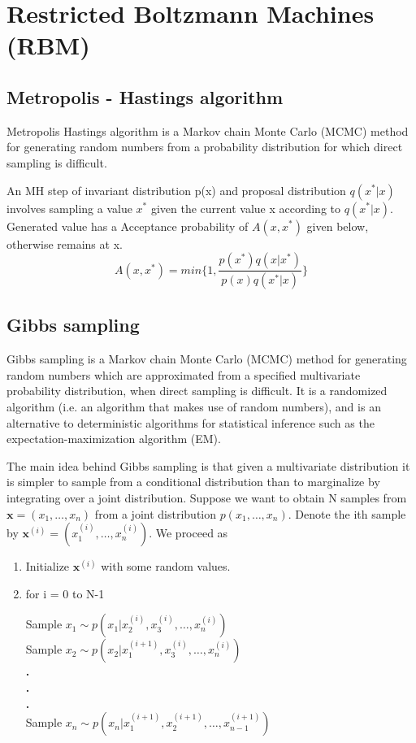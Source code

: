 \section{Restricted Boltzmann Machines (RBM)}

\subsection{Metropolis - Hastings algorithm}

Metropolis Hastings algorithm is a Markov chain Monte Carlo (MCMC) method for generating random numbers from a probability distribution for which direct sampling is difficult.

An MH step of invariant distribution p(x) and proposal distribution $ q(x^{\ast}|x) $ involves sampling a value $ x^{\ast} $ given the current value x according to $ q(x^{\ast} | x) $. Generated value has a Acceptance probability of
$ A(x,x^{\ast})$ given below, otherwise remains at x.
$$ A(x,x^{\ast}) = min\{1,\frac{p(x^\ast)q(x|x^{\ast})}{p(x)q(x^{\ast}|x)}\} $$



\subsection{Gibbs sampling}

Gibbs sampling is a Markov chain Monte Carlo (MCMC) method for generating random numbers which are approximated from a specified multivariate probability distribution, when direct sampling is difficult. It is a randomized algorithm (i.e. an algorithm that makes use of random numbers), and is an alternative to deterministic algorithms for statistical inference such as the expectation-maximization algorithm (EM).

The main idea behind Gibbs sampling is that given a multivariate distribution it is simpler to sample from a conditional distribution than to marginalize by integrating over a joint distribution. Suppose we want to obtain N samples from $ \mathbf{x} = (x_1, \dots, x_n) $ from a joint distribution $ p(x_1, \dots, x_n) $. Denote the ith sample by $ \mathbf{x}^{(i)} = (x_1^{(i)}, \dots, x_n^{(i)})$. We proceed as

\begin{enumerate}
	\item Initialize $ \mathbf{x}^{(i)} $ with some random values.
	\item for i = 0 to N-1
	
	Sample $x_1 \sim p(x_1|x_2^{(i)},x_{3}^{(i)},\dots,x_n^{(i)}) $\\
	Sample $x_2 \sim p(x_2|x_1^{(i+1)},x_{3}^{(i)},\dots,x_n^{(i)}) $\\
	\textbf{.}\\
	\textbf{.}\\
	\textbf{.}\\
	Sample $x_n \sim p(x_n|x_1^{(i+1)},x_{2}^{(i+1)},\dots,x_{n-1}^{(i+1)})$\\
	
\end{enumerate}


